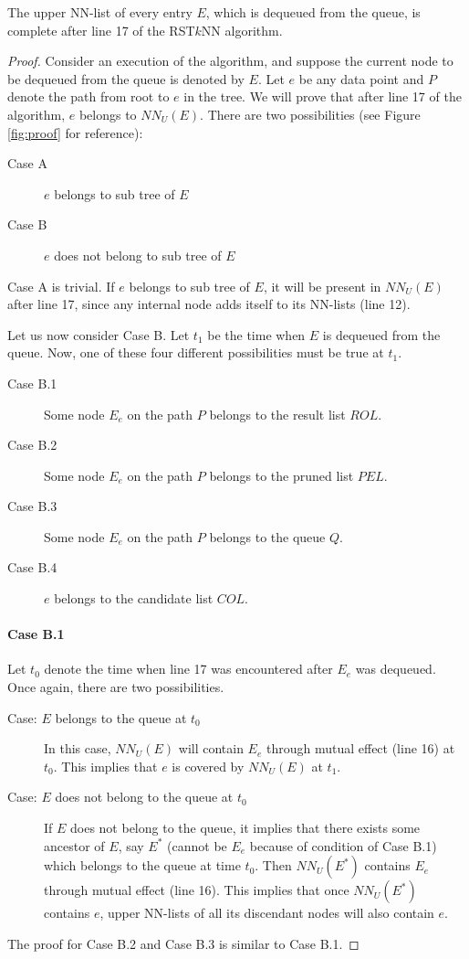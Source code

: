 \documentclass[prodmode,letterpaper]{acmsmall}
\newcommand{\rstknn}{RST$k$NN\xspace}
\begin{document}
\begin{lemma}\label{lemma:proof-3}
The upper NN-list of every entry $E$, which is dequeued from the queue, is complete after line 17 of the \rstknn algorithm.
\end{lemma}
\begin{proof}
Consider an execution of the algorithm, and suppose the current node to be
dequeued from the queue is denoted by $E$. Let $e$ be any data point and $P$
denote the path from root to $e$ in the tree.
We will prove that after line 17 of the
algorithm, $e$ belongs to $NN_U(E)$. 
There are two
possibilities (see Figure \ref{fig:proof} for reference):
\begin{description}
    \item [Case A] $e$ belongs to sub tree of $E$
    \item [Case B] $e$ does not belong to sub tree of $E$
\end{description}

Case A is trivial. If $e$ belongs to sub tree of $E$, it will be present in
$NN_U(E)$ after line 17, since any internal node adds itself to its NN-lists
(line 12).

Let us now consider Case B.
Let $t_1$ be the time when $E$ is dequeued from the queue.
Now, one of these four different possibilities must be true at $t_1$.
\begin{description}
    \item[Case B.1] Some node $E_e$ on the path $P$ belongs to the result list
	$ROL$.
    \item[Case B.2] Some node $E_e$ on the path $P$ belongs to the pruned list
	$PEL$.
    \item[Case B.3] Some node $E_e$ on the path $P$ belongs to the queue $Q$.
    \item[Case B.4] $e$ belongs to the candidate list $COL$.
\end{description}
\paragraph{Case B.1}
Let $t_0$ denote the time when line 17 was encountered after $E_e$ was dequeued. Once again, there are two
possibilities.
\begin{description}
    \item[Case: $E$ belongs to the queue at $t_0$] In this case, $NN_U(E)$ will contain
	$E_e$ through mutual effect (line 16) at $t_0$. This implies
	that $e$ is covered by $NN_U(E)$ at $t_1$.
    \item [Case: $E$ does not belong to the queue at $t_0$]
If $E$ does not belong to the queue, it implies that there exists some ancestor
of $E$, say $E^*$ (cannot be $E_e$ because of condition of Case B.1) which
belongs to the queue at time $t_0$. Then $NN_U(E^*)$ contains $E_e$ through
mutual effect (line 16). This implies that once
$NN_U(E^*)$ contains $e$, upper NN-lists of all its discendant nodes will also contain
$e$.
\end{description}
The proof for Case B.2 and Case B.3 is similar to Case B.1.


\end{proof}
\end{document}
